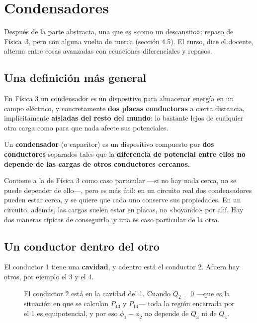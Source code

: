 \documentclass[12pt,a4paper]{article}
\begin{document}
\section{Condensadores}

Después de la parte abstracta, una que es «como un descansito»: repaso de
Física~3, pero con alguna vuelta de tuerca (sección 4.5). El curso, dice el
docente, alterna entre cosas avanzadas con ecuaciones diferenciales y repasos.

\subsection{Una definición más general}

En Física 3 un condensador es un dispositivo para almacenar energía en un campo
eléctrico, y concretamente \textbf{dos placas conductoras} a cierta distancia,
implícitamente \textbf{aisladas del resto del mundo}: lo bastante lejos de
cualquier otra carga como para que nada afecte sus potenciales.

\begin{keybox}
Un \textbf{condensador} (o capacitor) es un dispositivo compuesto por \textbf{dos
conductores} separados tales que la \textbf{diferencia de potencial entre ellos
no depende de las cargas de otros conductores cercanos}.
\end{keybox}

Contiene a la de Física 3 como caso particular ---si no hay nada cerca, no se
puede depender de ello---, pero es más útil: en un circuito real dos condensadores
pueden estar cerca, y se quiere que cada uno conserve sus propiedades. En un
circuito, además, las cargas suelen estar en placas, no «boyando» por ahí. Hay dos
maneras típicas de conseguirlo, y una es caso particular de la otra.

\subsection{Un conductor dentro del otro}

El conductor 1 tiene una \textbf{cavidad}, y adentro está el conductor 2. Afuera
hay otros, por ejemplo el 3 y el 4.

\begin{figure}[H]
  \centering
  
  \caption{El conductor 2 está en la cavidad del 1. Cuando $Q_2 = 0$ ---que es la
  situación en que se calculan $P_{13}$ y $P_{14}$--- toda la región encerrada
  por el 1 es equipotencial, y por eso $\phi_1 - \phi_2$ no depende de $Q_3$ ni de
  $Q_4$.}
\end{figure}
\end{document}
